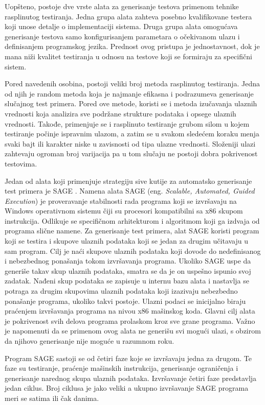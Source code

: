 \documentclass[12pt,oneside]{memoir}
\begin{document}
Uopšteno, postoje dve vrste alata za generisanje testova primenom tehnike rasplinutog testiranja. Jedna grupa alata zahteva posebno kvalifikovane testera koji unose detalje o implementaciji sistema. Druga grupa alata omogućava generisanje testova samo konfigurisanjem parametara o očekivanom ulazu i definisanjem programskog jezika. Prednost ovog pristupa je jednostavnost, dok je mana niži kvalitet testiranja u odnosu na testove koji se formiraju za specifični sistem. 
\par
Pored navedenih osobina, postoji veliki broj metoda rasplinutog testiranja. Jedna od njih je random metoda koja je najmanje efikasna i podrazumeva generisanje slučajnog test primera. Pored ove metode, koristi se i metoda izučavanja ulaznih vrednosti koja analizira sve podržane strukture podataka i opsege ulaznih vrednosti. Takođe, primenjuje se i rasplinuto testiranje grubom silom u kojem testiranje počinje ispravnim ulazom, a zatim se u svakom sledećem koraku menja svaki bajt ili karakter niske u zavisnosti od tipa ulazne vrednosti. Složeniji ulazi zahtevaju ogroman broj varijacija pa u tom slučaju ne postoji dobra pokrivenost testovima.
\par
Jedan od alata koji primenjuje strategiju sive kutije za automatsko generisanje test primera je SAGE \cite{ToolSAGE}. Namena alata SAGE (eng. \textit{Scalable, Automated, Guided Execution}) je proveravanje stabilnosti rada programa koji se izvršavaju na Windows operativnom sistemu čiji su procesori kompatibilni sa x86 skupom instrukcija. Odlikuje se specifičnom arhitekturom i algoritmom koji ga izdvaja od programa slične namene. Za generisanje test primera, alat SAGE koristi program koji se testira i skupove ulaznih podataka koji se jedan za drugim učitavaju u sam program. Cilj je naći skupove ulaznih podataka koji dovode do nedefinisanog i nebezbednog ponašanja tokom izvršavanja programa. Ukoliko SAGE uspe da generiše takav skup ulaznih podataka, smatra se da je on uspešno ispunio svoj zadatak. Nađeni skup podataka se zapisuje u internu bazu alata i nastavlja se potraga za drugim skupovima ulaznih podataka koji izazivaju nebezbedno ponašanje programa, ukoliko takvi postoje. Ulazni podaci se inicijalno biraju praćenjem izvršavanja programa na nivou x86 mašinskog koda. Glavni cilj alata je pokrivenost svih delova programa prolaskom kroz sve grane programa. Važno je napomenuti da se primenom ovog alata ne generišu svi mogući ulazi, s obzirom da njihovo generisanje nije moguće u razumnom roku. 
\par
Program SAGE sastoji se od četiri faze koje se izvršavaju jedna za drugom. Te faze su testiranje, praćenje mašinskih instrukcija, generisanje ograničenja i generisanje narednog skupa ulaznih podataka. Izvršavanje četiri faze predstavlja jedan ciklus. Broj ciklusa je jako veliki a ukupno izvršavanje SAGE programa meri se satima ili čak danima. 
\end{document}
